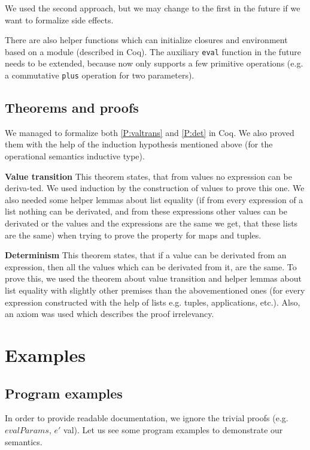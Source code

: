 \documentclass[12pt]{article}
\theoremstyle{definition}
\numberwithin{equation}{section}
\begin{document}
We used the second approach, but we may change to the first in the future if we want to formalize side effects.

There are also helper functions which can initialize closures and environment based on a module (described in Coq). The auxiliary \verb|eval| function in the future needs to be extended, because now only supports a few primitive operations (e.g. a commutative \verb|plus| operation for two parameters).

\subsection{Theorems and proofs}

We managed to formalize both \ref{P:valtrans} and \ref{P:det} in Coq. We also proved them with the help of the induction hypothesis mentioned above (for the operational semantics inductive type).

{\bf Value transition} This theorem states, that from values no expression can be deriva-ted. We used induction by the construction of values to prove this one. We also needed some helper lemmas about list equality (if from every expression of a list nothing can be derivated, and from these expressions other values can be derivated or the values and the expressions are the same we get, that these lists are the same) when trying to prove the property for maps and tuples.

{\bf Determinism} This theorem states, that if a value can be derivated from an expression, then all the values which can be derivated from it, are the same. To prove this, we used the theorem about value transition and helper lemmas about list equality with slightly other premises than the abovementioned ones (for every expression constructed with the help of lists e.g. tuples, applications, etc.). Also, an axiom was used which describes the proof irrelevancy.

\section{Examples}

\subsection{Program examples}

In order to provide readable documentation, we ignore the trivial proofs (e.g. $evalParams$, $e'$ val). Let us see some program examples to demonstrate our semantics.
\end{document}
